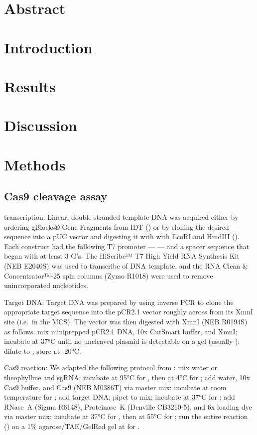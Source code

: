 \documentclass[10pt,oneside]{article}
\begin{document}
\section{Abstract}

\section{Introduction}

\section{Results}

\section{Discussion}

\section{Methods}

\subsection{\Invitro{} Cas9 cleavage assay}

\Invitro{} transcription: Linear, double-stranded template DNA was acquired 
either by ordering gBlocks® Gene Fragments from IDT () or by cloning 
the desired sequence into a pUC vector and digesting it with with EcoRI and 
HindIII ().  Each construct had the following T7 promoter --- 
 --- and a spacer sequence that began with at 
least 3 G's.  The HiScribe™ T7 High Yield RNA Synthesis Kit (NEB E2040S) was 
used to transcribe  of DNA template, and the RNA Clean \& 
Concentrator™-25 spin columns (Zymo R1018) were used to remove unincorporated 
nucleotides.

Target DNA: Target DNA was prepared by using inverse PCR to clone the 
appropriate target sequence into the pCR2.1 vector roughly across from its XmnI 
site (i.e.\ in the MCS).  The vector was then digested with XmnI (NEB R0194S) 
as follows: mix   miniprepped pCR2.1 DNA,  10x 
CutSmart buffer, and   XmnI; incubate at 37°C until no 
uncleaved plasmid is detectable on a gel (usually ); dilute to 
; store at -20°C.  

Cas9 reaction: We adapted the following protocol from : 
mix  water or  theophylline and   sgRNA; 
incubate at 95°C for , then at 4°C for ; add  water, 
 10x Cas9 buffer, and   Cas9 (NEB M0386T) via master 
mix; incubate at room temperature for ; add   target 
DNA; pipet to mix; incubate at 37°C for ; add   RNase~A 
(Sigma R6148),   Proteinase~K (Denville CB3210-5), and 
 6x loading dye via master mix; incubate at 37°C for , then 
at 55°C for ; run the entire reaction () on a 1\% 
agarose/TAE/GelRed gel at  for .
\end{document}
